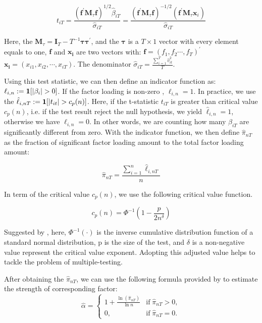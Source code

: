 \[t_{i T}=\frac{\left(\bm{f}^{\prime} \bm{M}_{\tau} \bm{f}\right)^{1 / 2} \hat{\beta}_{i T}}{\hat{\sigma}_{i T}}=\frac{\left(\bm{f}^{\prime} \bm{M}_{\tau} \bm{f}\right)^{-1 / 2}\left(\bm{f}^{\prime} \bm{M}_{\tau} \bm{x}_{i}\right)}{\hat{\sigma}_{i T}} \tag{3} \label{test_statistic} \]

Here, the $\bm{M}_{\tau} = \bm{I}_T - T^{-1}\bm{\tau}\bm{\tau^\prime}$, and the $\bm{\tau}$ is a $T\times 1$ vector with every element equals to one, $\bm{f}$ and $\bm{x_i}$ are two vectors with: $\bm{f} = (f_1, f_2 \cdots, f_T)^{\prime}$   $\bm{x_i} = (x_{i1}, x_{i2}, \cdots, x_{iT})$.
The denominator $\hat{\sigma}_{iT} = \frac{\sum_{i=1}^{T} \hat{v}^2_{it} }{T}$.

Using this test statistic, we can then define an indicator function as: $\ell_{i,n} := {\bf1}[|\beta_i|>0]$.
If the factor loading is non-zero , $\ell_{i,n} = 1$.
In practice, we use the $\hat{\ell}_{i,nT} := {\bf1}[|t_{it}|>c_p(n)]$.
Here, if the t-statistic $t_{iT}$ is greater than critical value $c_p(n)$, i.e. if the test result reject the null hypothesis, we yield $\hat{\ell}_{i,n} = 1$, otherwise we have $\hat{\ell}_{i,n} = 0$.
In other words, we are counting how many $\hat{\beta}_{iT}$ are significantly different from zero.
With the indicator function, we then define $\hat{\pi}_{nT}$ as the fraction of significant factor loading amount to the total factor loading amount:

\[  \hat{\pi}_{nT} = \frac{\sum_{i=1}^n \hat{\ell}_{i,nT}}{n} \tag{4} \label{pi_function} \]


In term of the critical value $c_p(n)$, we use the following critical value function.

\[   c_p(n) = \Phi^{-1}(1 - \frac{p}{2n^\delta})   \tag{5} \label{critical_value_function} \]

Suggested by , here, $\Phi^{-1}(\cdot)$ is the inverse cumulative distribution function of a standard normal distribution, p is the size of the test, and $\delta$ is a non-negative value represent the critical value exponent. 
Adopting this adjusted value helps to tackle the problem of multiple-testing.


After obtaining the $\hat{\pi}_{nT}$, we can use the following formula provided by  to estimate the strength of corresponding factor:
\[ \hat{\alpha} = \begin{cases}
1+\frac{\ln(\hat{\pi}_{nT})}{\ln n} & \text{if}\; \hat{\pi}_{nT} > 0,\\
0, & \text{if}\; \hat{\pi}_{nT} = 0.
	\end{cases} \tag{6} \label{estimation_method} \]


